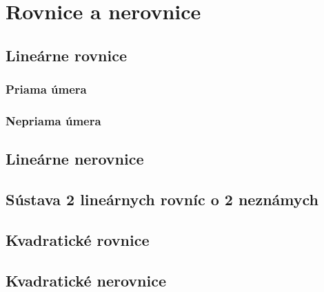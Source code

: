 \chapter{Rovnice a nerovnice}
\label{chap:rov}

\section{Lineárne rovnice}

\subsection{Priama úmera}

\subsection{Nepriama úmera}

\section{Lineárne nerovnice}

\section{Sústava 2 lineárnych rovníc o 2 neznámych}

\section{Kvadratické rovnice}

\section{Kvadratické nerovnice}